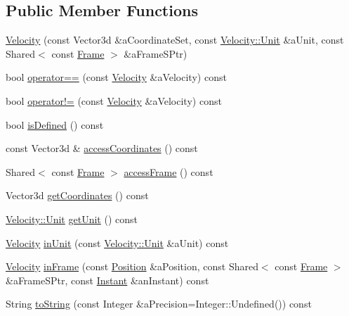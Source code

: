 \subsection*{Public Member Functions}
\begin{DoxyCompactItemize}
\item 
\hyperlink{classostk_1_1physics_1_1coord_1_1_velocity_a2e45f5a6e1025cd21a2f5fa61c6a940a}{Velocity} (const Vector3d \&a\+Coordinate\+Set, const \hyperlink{classostk_1_1physics_1_1coord_1_1_velocity_a01701e56094328a31d0211da5ac1ba28}{Velocity\+::\+Unit} \&a\+Unit, const Shared$<$ const \hyperlink{classostk_1_1physics_1_1coord_1_1_frame}{Frame} $>$ \&a\+Frame\+S\+Ptr)
\item 
bool \hyperlink{classostk_1_1physics_1_1coord_1_1_velocity_abadc0cc438b95d0820aa82603a0cd25b}{operator==} (const \hyperlink{classostk_1_1physics_1_1coord_1_1_velocity}{Velocity} \&a\+Velocity) const
\item 
bool \hyperlink{classostk_1_1physics_1_1coord_1_1_velocity_a83127c62ea6ce9497f57622a2ea3dbf0}{operator!=} (const \hyperlink{classostk_1_1physics_1_1coord_1_1_velocity}{Velocity} \&a\+Velocity) const
\item 
bool \hyperlink{classostk_1_1physics_1_1coord_1_1_velocity_a19318a3cef12b4248cd12e043ee41591}{is\+Defined} () const
\item 
const Vector3d \& \hyperlink{classostk_1_1physics_1_1coord_1_1_velocity_a2c567b0c5a5d2036e5ba8a043ddda598}{access\+Coordinates} () const
\item 
Shared$<$ const \hyperlink{classostk_1_1physics_1_1coord_1_1_frame}{Frame} $>$ \hyperlink{classostk_1_1physics_1_1coord_1_1_velocity_aa2f7454c6f34503989d6adf2e5d581f6}{access\+Frame} () const
\item 
Vector3d \hyperlink{classostk_1_1physics_1_1coord_1_1_velocity_a50636bdf695b2765ea94a5b76258ebc3}{get\+Coordinates} () const
\item 
\hyperlink{classostk_1_1physics_1_1coord_1_1_velocity_a01701e56094328a31d0211da5ac1ba28}{Velocity\+::\+Unit} \hyperlink{classostk_1_1physics_1_1coord_1_1_velocity_ae512730ddb567de93fe9f77e116557a0}{get\+Unit} () const
\item 
\hyperlink{classostk_1_1physics_1_1coord_1_1_velocity}{Velocity} \hyperlink{classostk_1_1physics_1_1coord_1_1_velocity_abafe2a4415f6bee5cdb0abd2c0b7d3dd}{in\+Unit} (const \hyperlink{classostk_1_1physics_1_1coord_1_1_velocity_a01701e56094328a31d0211da5ac1ba28}{Velocity\+::\+Unit} \&a\+Unit) const
\item 
\hyperlink{classostk_1_1physics_1_1coord_1_1_velocity}{Velocity} \hyperlink{classostk_1_1physics_1_1coord_1_1_velocity_aedf31d29406d85a2d302e7a5d51af4f3}{in\+Frame} (const \hyperlink{classostk_1_1physics_1_1coord_1_1_position}{Position} \&a\+Position, const Shared$<$ const \hyperlink{classostk_1_1physics_1_1coord_1_1_frame}{Frame} $>$ \&a\+Frame\+S\+Ptr, const \hyperlink{classostk_1_1physics_1_1time_1_1_instant}{Instant} \&an\+Instant) const
\item 
String \hyperlink{classostk_1_1physics_1_1coord_1_1_velocity_a130159d8ac35bd33440cb1890d65e8a5}{to\+String} (const Integer \&a\+Precision=Integer\+::\+Undefined()) const
\end{DoxyCompactItemize}
